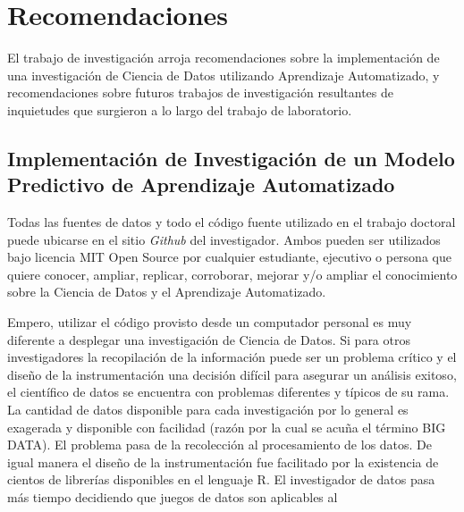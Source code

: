 \section{Recomendaciones}
El trabajo de investigación arroja recomendaciones sobre la implementación de una investigación de Ciencia de Datos utilizando Aprendizaje Automatizado, y recomendaciones sobre futuros trabajos de investigación resultantes de inquietudes que surgieron a lo largo del trabajo de laboratorio.

\subsection{Implementación de Investigación de un Modelo Predictivo de Aprendizaje Automatizado}
Todas las fuentes de datos y todo el código fuente utilizado en el trabajo doctoral puede ubicarse en el sitio \emph{Github} del investigador. Ambos pueden ser utilizados bajo licencia MIT Open Source por cualquier estudiante, ejecutivo o persona que quiere conocer, ampliar, replicar, corroborar, mejorar y/o ampliar el conocimiento sobre la Ciencia de Datos y el Aprendizaje Automatizado.

Empero, utilizar el código provisto desde un computador personal es muy diferente a desplegar una investigación de Ciencia de Datos. Si para otros investigadores la recopilación de la información puede ser un problema crítico y el diseño de la instrumentación una decisión difícil para asegurar un análisis exitoso, el científico de datos se encuentra con problemas diferentes y típicos de su rama. La cantidad de datos disponible para cada investigación por lo general es exagerada y disponible con facilidad (razón por la cual se acuña el término BIG DATA). El problema pasa de la recolección al procesamiento de los datos. De igual manera el diseño de la instrumentación fue facilitado por la existencia de cientos de librerías disponibles en el lenguaje R. El investigador de datos pasa más tiempo decidiendo que juegos de datos son aplicables al
